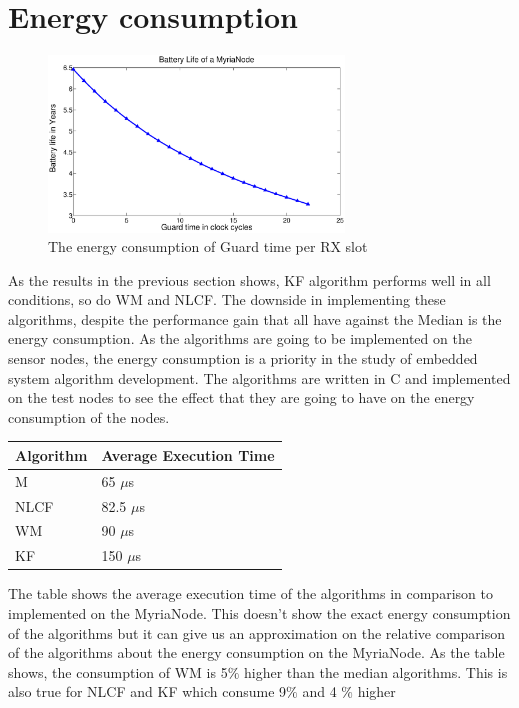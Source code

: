 \documentclass[a4paper,10pt]{report}
\begin{document}
\section{\textbf{Energy consumption}}
\begin{figure}
\centering
\includegraphics[width=0.7\textwidth]{guardsave}
\caption{The energy consumption of Guard time per RX slot}
\label{energyguard}
\end{figure}
As the results in the previous section shows, KF algorithm performs
well in all conditions, so do WM and NLCF. The downside in
implementing these algorithms, despite the performance gain that all
have against the Median is the energy consumption. As the algorithms
are going to be implemented on the sensor nodes, the energy
consumption is a priority in the study of embedded system algorithm
development. The algorithms are written in C and implemented on the
test nodes to see the effect that they are going to have on the
energy consumption of the nodes.
\begin{center}
    \begin{tabular}{ |p{2cm} | p{4.75cm} |}
    \hline
    Algorithm & Average Execution Time \\ \hline
    M &  65 $\mu$s \\ \hline
    NLCF & 82.5 $\mu$s \\ \hline
    WM &   90 $\mu$s \\ \hline
    KF &  150 $\mu$s  \\ \hline
    \end{tabular}
\label{tab}
\end{center}
The table shows the average execution time of the algorithms in
comparison to implemented on the MyriaNode. This doesn't show the
exact energy consumption of the algorithms but it can give us an
approximation on the relative comparison of the algorithms about the
energy consumption on the MyriaNode. As the table shows, the
consumption of WM is 5$\%$ higher than the median algorithms. This
is also true for NLCF and KF which consume 9$\%$ and 4 $\%$ higher
\end{document}
